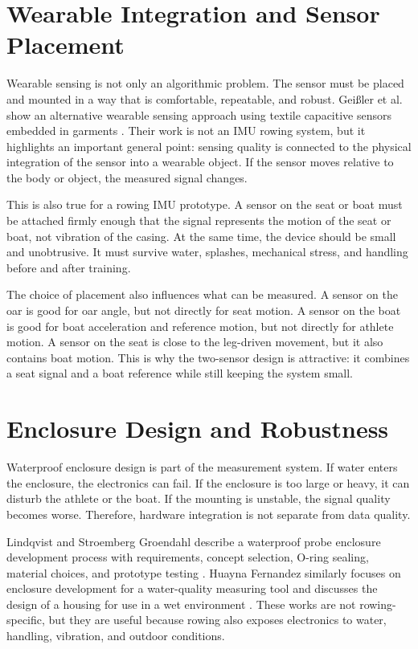 \section{Wearable Integration and Sensor Placement}

Wearable sensing is not only an algorithmic problem. The sensor must be placed and mounted in a way that is comfortable, repeatable, and robust. Gei\ss{}ler et al. show an alternative wearable sensing approach using textile capacitive sensors embedded in garments \cite{geisler_embedding_2024}. Their work is not an IMU rowing system, but it highlights an important general point: sensing quality is connected to the physical integration of the sensor into a wearable object. If the sensor moves relative to the body or object, the measured signal changes.

This is also true for a rowing IMU prototype. A sensor on the seat or boat must be attached firmly enough that the signal represents the motion of the seat or boat, not vibration of the casing. At the same time, the device should be small and unobtrusive. It must survive water, splashes, mechanical stress, and handling before and after training.

The choice of placement also influences what can be measured. A sensor on the oar is good for oar angle, but not directly for seat motion. A sensor on the boat is good for boat acceleration and reference motion, but not directly for athlete motion. A sensor on the seat is close to the leg-driven movement, but it also contains boat motion. This is why the two-sensor design is attractive: it combines a seat signal and a boat reference while still keeping the system small.

\section{Enclosure Design and Robustness}

Waterproof enclosure design is part of the measurement system. If water enters the enclosure, the electronics can fail. If the enclosure is too large or heavy, it can disturb the athlete or the boat. If the mounting is unstable, the signal quality becomes worse. Therefore, hardware integration is not separate from data quality.

Lindqvist and Stroemberg Groendahl describe a waterproof probe enclosure development process with requirements, concept selection, O-ring sealing, material choices, and prototype testing \cite{lindqvist_design_2015}. Huayna Fernandez similarly focuses on enclosure development for a water-quality measuring tool and discusses the design of a housing for use in a wet environment \cite{huayna_fernandez_enclosure_2025}. These works are not rowing-specific, but they are useful because rowing also exposes electronics to water, handling, vibration, and outdoor conditions.

